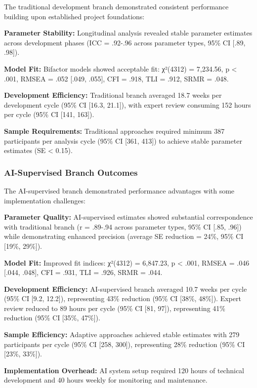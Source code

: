 \documentclass[12pt,a4paper]{article}
\begin{document}
The traditional development branch demonstrated consistent performance building upon established project foundations:

\textbf{Parameter Stability:} Longitudinal analysis revealed stable parameter estimates across development phases (ICC = .92-.96 across parameter types, 95\% CI [.89, .98]).

\textbf{Model Fit:} Bifactor models showed acceptable fit: χ²(4312) = 7,234.56, p < .001, RMSEA = .052 [.049, .055], CFI = .918, TLI = .912, SRMR = .048.

\textbf{Development Efficiency:} Traditional branch averaged 18.7 weeks per development cycle (95\% CI [16.3, 21.1]), with expert review consuming 152 hours per cycle (95\% CI [141, 163]).

\textbf{Sample Requirements:} Traditional approaches required minimum 387 participants per analysis cycle (95\% CI [361, 413]) to achieve stable parameter estimates (SE < 0.15).

\subsubsection{AI-Supervised Branch Outcomes}

The AI-supervised branch demonstrated performance advantages with some implementation challenges:

\textbf{Parameter Quality:} AI-supervised estimates showed substantial correspondence with traditional branch (r = .89-.94 across parameter types, 95\% CI [.85, .96]) while demonstrating enhanced precision (average SE reduction = 24\%, 95\% CI [19\%, 29\%]).

\textbf{Model Fit:} Improved fit indices: χ²(4312) = 6,847.23, p < .001, RMSEA = .046 [.044, .048], CFI = .931, TLI = .926, SRMR = .044.

\textbf{Development Efficiency:} AI-supervised branch averaged 10.7 weeks per cycle (95\% CI [9.2, 12.2]), representing 43\% reduction (95\% CI [38\%, 48\%]). Expert review reduced to 89 hours per cycle (95\% CI [81, 97]), representing 41\% reduction (95\% CI [35\%, 47\%]).

\textbf{Sample Efficiency:} Adaptive approaches achieved stable estimates with 279 participants per cycle (95\% CI [258, 300]), representing 28\% reduction (95\% CI [23\%, 33\%]).

\textbf{Implementation Overhead:} AI system setup required 120 hours of technical development and 40 hours weekly for monitoring and maintenance.
\end{document}
